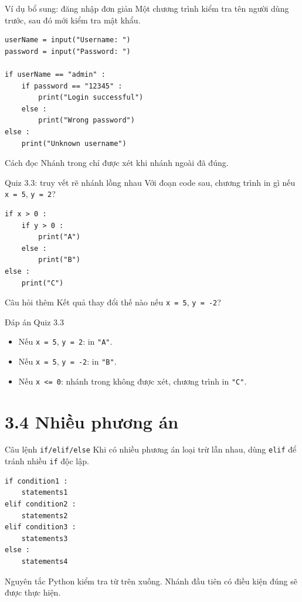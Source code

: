 \documentclass[aspectratio=169,11pt]{beamer}
\newcommand{\code}[1]{\texttt{#1}}
\begin{document}
\begin{frame}[fragile]{Ví dụ bổ sung: đăng nhập đơn giản}
Một chương trình kiểm tra tên người dùng trước, sau đó mới kiểm tra mật khẩu.
\begin{lstlisting}[style=py]
userName = input("Username: ")
password = input("Password: ")

if userName == "admin" :
    if password == "12345" :
        print("Login successful")
    else :
        print("Wrong password")
else :
    print("Unknown username")
\end{lstlisting}
\begin{block}{Cách đọc}
Nhánh trong chỉ được xét khi nhánh ngoài đã đúng.
\end{block}
\end{frame}

\begin{frame}[fragile]{Quiz 3.3: truy vết rẽ nhánh lồng nhau}
Với đoạn code sau, chương trình in gì nếu \code{x = 5}, \code{y = 2}?
\begin{lstlisting}[style=py]
if x > 0 :
    if y > 0 :
        print("A")
    else :
        print("B")
else :
    print("C")
\end{lstlisting}
\vspace{0.5em}
\begin{exampleblock}{Câu hỏi thêm}
Kết quả thay đổi thế nào nếu \code{x = 5}, \code{y = -2}?
\end{exampleblock}
\end{frame}

\begin{frame}{Đáp án Quiz 3.3}
\begin{itemize}
  \item Nếu \code{x = 5}, \code{y = 2}: in \code{"A"}.
  \item Nếu \code{x = 5}, \code{y = -2}: in \code{"B"}.
  \item Nếu \code{x <= 0}: nhánh trong không được xét, chương trình in \code{"C"}.
\end{itemize}
\end{frame}

\section{3.4 Nhiều phương án}

\begin{frame}[fragile]{Câu lệnh \texttt{if/elif/else}}
Khi có nhiều phương án loại trừ lẫn nhau, dùng \code{elif} để tránh nhiều \code{if} độc lập.
\begin{lstlisting}[style=py]
if condition1 :
    statements1
elif condition2 :
    statements2
elif condition3 :
    statements3
else :
    statements4
\end{lstlisting}
\begin{block}{Nguyên tắc}
Python kiểm tra từ trên xuống. Nhánh đầu tiên có điều kiện đúng sẽ được thực hiện.
\end{block}
\end{frame}
\end{document}
